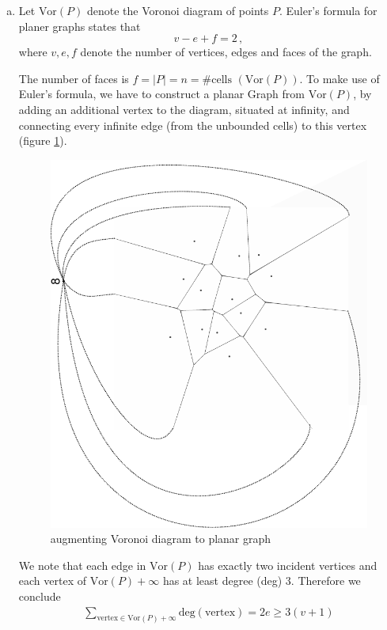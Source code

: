 \documentclass[10pt,a4paper,boxed]{hmcpset}
\newcommand{\Vor}[1]{\textrm{Vor}(#1)}
\begin{document}
\begin{solution}
\begin{enumerate}[(a)]
				\item Let $\Vor{P}$ denote the Voronoi diagram of points $P$. Euler's formula for planer graphs states that
				\[ v - e + f = 2\,, \] where $v, e, f$ denote the number of vertices, edges and faces of the graph.
				
				The number of faces is $ f = \vert P \vert = n = \#\textrm{cells } (\Vor{P})$. To make use of Euler's formula, we have to construct a planar Graph from $ \Vor{P} $, by adding an additional vertex to the diagram, situated at infinity, and connecting every infinite edge (from the unbounded cells) to this vertex (figure \ref{fig:VorGraph}).
				
				\begin{figure}[h]
    			\centering
    			\includegraphics[scale=0.4]{1b.pdf} 
    			\caption{augmenting Voronoi diagram to planar graph}
    			\label{fig:VorGraph}
				\end{figure} 
				
				We note that each edge in $ \Vor{P} $ has exactly two incident vertices and each vertex of $ \Vor{P}+\infty $ has at least degree (\textrm{deg}) $ 3 $. Therefore we conclude
				\begin{align}
					\sum_{\textrm{vertex} \in \Vor{P}+\infty} \textrm{deg}(\textrm{vertex})  = 2e \geq 3 (v + 1) \label{eq:1}
				\end{align}
								

\end{enumerate}
\end{solution}
\end{document}
